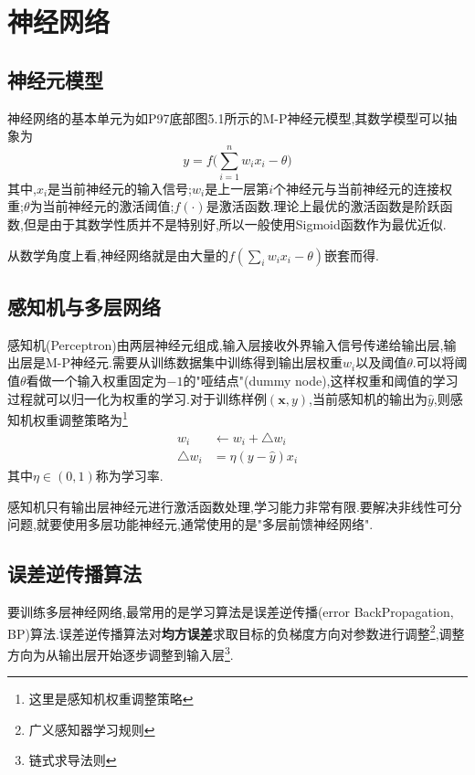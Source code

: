 \chapter{神经网络}

\section{神经元模型}

神经网络的基本单元为如P97底部图5.1所示的M-P神经元模型,其数学模型可以抽象为
\begin{equation}
y=f\Big(\sum_{i=1}^nw_ix_i-\theta\Big)
\end{equation}
其中,$x_i$是当前神经元的输入信号;$w_i$是上一层第$i$个神经元与当前神经元的连接权重;$\theta$为当前神经元的激活阈值;$f(\cdot)$是激活函数.理论上最优的激活函数是阶跃函数,但是由于其数学性质并不是特别好,所以一般使用Sigmoid函数作为最优近似.

从数学角度上看,神经网络就是由大量的$f(\sum_iw_ix_i-\theta)$嵌套而得.

\section{感知机与多层网络}

感知机(Perceptron)由两层神经元组成,输入层接收外界输入信号传递给输出层,输出层是M-P神经元.需要从训练数据集中训练得到输出层权重$w_i$以及阈值$\theta$.可以将阈值$\theta$看做一个输入权重固定为$-1$的"哑结点"(dummy node),这样权重和阈值的学习过程就可以归一化为权重的学习.对于训练样例$(\mathbf x,y)$,当前感知机的输出为$\hat y$,则感知机权重调整策略为\footnote{这里是感知机权重调整策略}
\begin{equation}\begin{split}
w_i&\leftarrow w_i+\bigtriangleup w_i \\
\bigtriangleup w_i&=\eta(y-\hat y)x_i
\end{split}\end{equation}
其中$\eta\in (0,1)$称为学习率.

感知机只有输出层神经元进行激活函数处理,学习能力非常有限.要解决非线性可分问题,就要使用多层功能神经元,通常使用的是"多层前馈神经网络".

\section{误差逆传播算法}

要训练多层神经网络,最常用的是学习算法是误差逆传播(error BackPropagation, BP)算法.误差逆传播算法对\textbf{均方误差}求取目标的负梯度方向对参数进行调整\footnote{广义感知器学习规则},调整方向为从输出层开始逐步调整到输入层\footnote{链式求导法则}.

